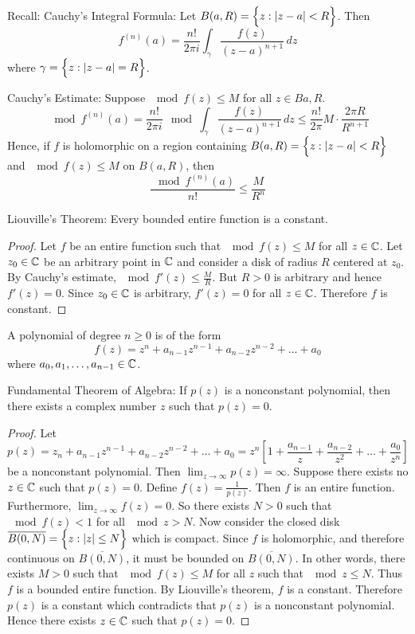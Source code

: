 \documentclass[12pt]{article}
\begin{document}
Recall: Cauchy's Integral Formula: Let $B(a,R) = \Big\{ z : \abs{z-a} < R \Big\}$. Then $$ f^{(n)}(a) = \frac{n!}{2\pi i} \int_\gamma \frac{f(z)}{(z-a)^{n+1}} \, dz $$ where $\gamma = \Big\{ z: \abs{z-a} = R \Big\}$. 
\begin{theorem} Cauchy's Estimate: Suppose $\mod{f(z)} \leq M$ for all $z \in B{a,R}$. 
$$\mod{f^{(n)}(a)} = \frac{n!}{2\pi i} \mod{ \int_\gamma \frac{f(z)}{(z-a)^{n+1}} \,dz} \leq \frac{n!}{2\pi} M \cdot \frac{2\pi R}{R^{n+1}}$$ Hence, if $f$ is holomorphic on a region containing $B(a,R) = \Big\{ z: \abs{z-a} < R \Big\}$ and $\mod{f(z)} \leq M$ on $B(a,R)$, then $$ \frac{\mod{f^{(n)}(a)}}{n!} \leq \frac{M}{R^n} $$ \end{theorem} 
\begin{theorem} Liouville's Theorem: Every bounded entire function is a constant. \end{theorem} 
\begin{proof} Let $f$ be an entire function such that $\mod{f(z)} \leq M$ for all $z \in \mathbb{C}$. Let $z_0 \in \mathbb{C}$ be an arbitrary point in $\mathbb{C}$ and consider a disk of radius $R$ centered at $z_0$. By Cauchy's estimate, $\mod{f'(z)} \leq \frac{M}{R}$. But $R > 0$ is arbitrary and hence $f'(z) = 0$. Since $z_0 \in \mathbb{C}$ is arbitrary, $f'(z) = 0$ for all $z \in \mathbb{C}$. Therefore $f$ is constant. \end{proof} 
A polynomial of degree $n \geq 0$ is of the form $$f(z) = z^n + a_{n-1}z^{n-1} + a_{n-2}z^{n-2} + \dots + a_0$$ where $a_0,a_1,\dots,a_{n-1} \in \mathbb{C}$. 
\begin{theorem} Fundamental Theorem of Algebra: If $p(z)$ is a nonconstant polynomial, then there exists a complex number $z$ such that $p(z) = 0$. \end{theorem} 
\begin{proof} Let $$p(z) = z_n + a_{n-1}z^{n-1} + a_{n-2}z^{n-2} + \dots + a_0 = z^n[1 + \frac{a_{n-1}}{z} + \frac{a_{n-2}}{z^2} + \dots + \frac{a_0}{z^n}] $$ be a nonconstant polynomial. Then $\lim_{z\to \infty} p(z) = \infty$. Suppose there exists no $z \in \mathbb{C}$ such that $p(z) = 0$. Define $f(z) = \frac{1}{p(z)}$. Then $f$ is an entire function. Furthermore, $\lim_{z\to\infty} f(z) = 0$. So there exists $N > 0$ such that $\mod{f(z)} < 1$ for all $\mod{z} > N$. Now consider the closed disk $\overline{B(0,N)} = \Big\{ z: \abs{z} \leq N \Big\}$ which is compact. Since $f$ is holomorphic, and therefore continuous on $\overline{B(0,N)}$, it must be bounded on $\overline{B(0,N)}$. In other words, there exists $M > 0$ such that $\mod{f(z)} \leq M$ for all $z$ such that $\mod{z} \leq N$. Thus $f$ is a bounded entire function. By Liouville's theorem, $f$ is a constant. Therefore $p(z)$ is a constant which contradicts that $p(z)$ is a nonconstant polynomial. Hence there exists $z \in \mathbb{C}$ such that $p(z) = 0$. \end{proof}
\end{document}
